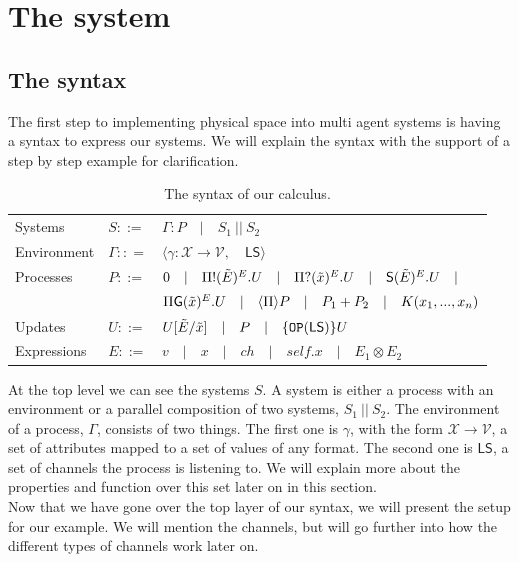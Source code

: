 \chapter{The system}
\section{The syntax}
The first step to implementing physical space into multi agent systems is having a syntax to express our systems. We will explain the syntax with the support of a step by step example for clarification. 
\begin{table}[H]
\centering
\begin{tabular}{|l l l|} 
 \hline
 Systems & $S ::=$ & $  \Gamma : P\quad |\quad S_1 \ || \ S_2$\\
 Environment & $\Gamma :: =$ & $ \langle \gamma : \mathcal{X} \to \mathcal{V},\quad \mathsf{LS} \rangle $ \\ 
 Processes & $P::=$ & $  0\quad  |\quad  \Pi ! (\Tilde{E})^{E}.U\quad  |\quad  \Pi ? (\Tilde{x})^{E}.U\quad  |\quad \mathsf{S}(\Tilde{E})^{E}.U \quad  |$ \\
 & & $\Pi \mathsf{G}(\Tilde{x})^E.U\quad  |\quad \langle \Pi \rangle P\quad |\quad  P_1 + P_2\quad  |\quad  K(x_1,...,x_n)$\\
 Updates & $U::= $ & $ U[\Tilde{E}/\Tilde{x}]\quad |\quad P\quad |\quad \{\texttt{OP}(\mathsf{LS})\}U$ \\
 Expressions & $E::=$ & $ v\quad |\quad x\quad |\quad ch\quad |\quad self.x\quad |\quad E_1\otimes E_2$ \\[1ex] 
 \hline
\end{tabular}
\caption{The syntax of our calculus.}
\label{Synt}
\end{table}
At the top level we can see the systems $S$. A system is either a process with an environment or a parallel composition of two systems, $S_1\ ||\ S_2$. The environment of a process, $\Gamma$, consists of two things. The first one is $\gamma$, with the form $\mathcal{X} \to \mathcal{V}$, a set of attributes mapped to a set of values of any format. The second one is $\mathsf{LS}$, a set of channels the process is listening to. We will explain more about the properties and function over this set later on in this section.\\
Now that we have gone over the top layer of our syntax, we will present the setup for our example. We will mention the channels, but will go further into how the different types of channels work later on.
